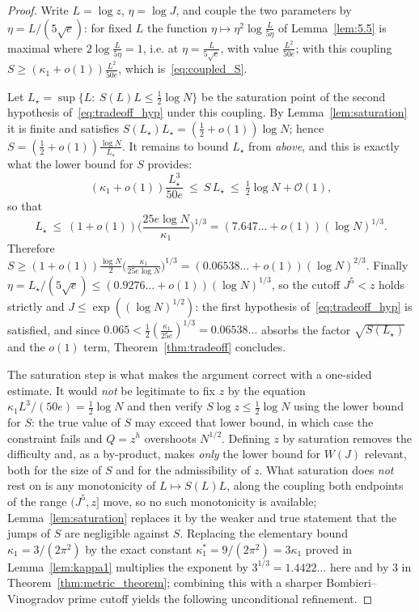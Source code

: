 \documentclass[11pt, a4paper]{article}
\theoremstyle{plain}
\theoremstyle{definition}
\begin{document}
\begin{proof}
Write $L=\log z$, $\eta=\log J$, and couple the two parameters by $\eta=L/(5\sqrt e)$: for fixed $L$ the function $\eta\mapsto\eta^{2}\log\frac{L}{5\eta}$ of Lemma~\ref{lem:5.5} is maximal where $2\log\frac{L}{5\eta}=1$, i.e. at $\eta=\frac{L}{5\sqrt e}$, with value $\frac{L^{2}}{50e}$; with this coupling $S\ge(\kappa_1+o(1))\frac{L^{2}}{50e}$, which is~\eqref{eq:coupled_S}.

Let $L_\star=\sup\{L:\ S(L)L\le\frac12\log N\}$ be the saturation point of the second hypothesis of~\eqref{eq:tradeoff_hyp} under this coupling. By Lemma~\ref{lem:saturation} it is finite and satisfies $S(L_\star)L_\star=(\frac12+o(1))\log N$; hence $S=(\tfrac12+o(1))\frac{\log N}{L_\star}$. It remains to bound $L_\star$ from \emph{above}, and this is exactly what the lower bound for $S$ provides:
$$(\kappa_1+o(1))\frac{L_\star^{3}}{50e}\ \le\ S\,L_\star\ \le\ \tfrac12\log N+\mathcal{O}(1),$$
so that
$$L_\star\ \le\ (1+o(1))\Big(\frac{25e\log N}{\kappa_1}\Big)^{1/3}=(7.647\ldots+o(1))(\log N)^{1/3}.$$
Therefore $S\ge(1+o(1))\frac{\log N}{2}\big(\frac{\kappa_1}{25e\log N}\big)^{1/3}=(0.06538\ldots+o(1))(\log N)^{2/3}$. Finally $\eta=L_\star/(5\sqrt{e})\le(0.9276\ldots+o(1))(\log N)^{1/3}$, so the cutoff $J^{5}<z$ holds strictly and $J\le\exp((\log N)^{1/2})$: the first hypothesis of~\eqref{eq:tradeoff_hyp} is satisfied, and since $0.065<\frac12(\frac{\kappa_1}{25e})^{1/3}=0.06538\ldots$ absorbs the factor $\sqrt{S(L_\star)}$ and the $o(1)$ term, Theorem~\ref{thm:tradeoff} concludes.

The saturation step is what makes the argument correct with a one-sided estimate. It would \emph{not} be legitimate to fix $z$ by the equation $\kappa_1L^{3}/(50e)=\frac12\log N$ and then verify $S\log z\le\frac12\log N$ using the lower bound for $S$: the true value of $S$ may exceed that lower bound, in which case the constraint fails and $Q=z^{h}$ overshoots $N^{1/2}$. Defining $z$ by saturation removes the difficulty and, as a by-product, makes \emph{only} the lower bound for $W(J)$ relevant, both for the size of $S$ and for the admissibility of $z$. What saturation does \emph{not} rest on is any monotonicity of $L\mapsto S(L)L$, along the coupling both endpoints of the range $(J^{5},z]$ move, so no such monotonicity is available; Lemma~\ref{lem:saturation} replaces it by the weaker and true statement that the jumps of $S$ are negligible against $S$. Replacing the elementary bound $\kappa_1=3/(2\pi^{2})$ by the exact constant $\kappa_1^{\ast}=9/(2\pi^{2})=3\kappa_1$ proved in Lemma~\ref{lem:kappa1} multiplies the exponent by $3^{1/3}=1.4422\ldots$ here and by $3$ in Theorem~\ref{thm:metric_theorem}; combining this with a sharper Bombieri--Vinogradov prime cutoff yields the following unconditional refinement.
\end{proof}
\end{document}
